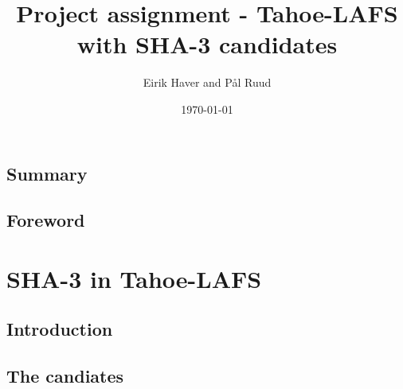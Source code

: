 \documentclass[english,12pt,a4paper]{report}
\author{Eirik Haver and Pål Ruud}
\title{Project assignment - Tahoe-LAFS with SHA-3 candidates}
\date{\today}
\begin{document}


\section*{Summary}

\section*{Foreword}

\tableofcontents
\newpage

\listoftables
\listoffigures


\chapter{SHA-3 in Tahoe-LAFS}

\section{Introduction}

\section{The candiates}
\end{document}
